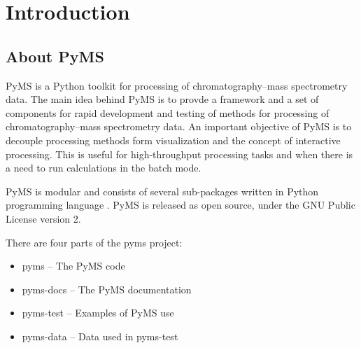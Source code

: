 

\chapter{Introduction}

\section{About PyMS}

PyMS is a Python toolkit for processing of chromatography--mass spectrometry
data. The main idea behind PyMS is to provde a framework and a set of
components for rapid development and testing of methods for processing of
chromatography--mass spectrometry data. An important objective of PyMS is
to decouple processing methods form visualization and the concept of
interactive processing. This is useful for high-throughput processing tasks
and when there is a need to run calculations in the batch mode.

PyMS is modular and consists of several sub-packages written in Python
programming language \cite{python}. PyMS is released as open source,
under the GNU Public License version 2.

There are four parts of the pyms project:

\begin{itemize}
  \item pyms -- The PyMS code
  \item pyms-docs -- The PyMS documentation
  \item pyms-test -- Examples of PyMS use
  \item pyms-data -- Data used in pyms-test 
\end{itemize}


